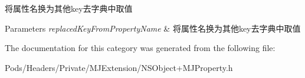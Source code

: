 将属性名换为其他key去字典中取值


\begin{DoxyParams}{Parameters}
{\em replaced\+Key\+From\+Property\+Name} & 将属性名换为其他key去字典中取值 \\
\hline
\end{DoxyParams}


The documentation for this category was generated from the following file\+:\begin{DoxyCompactItemize}
\item 
Pods/\+Headers/\+Private/\+M\+J\+Extension/N\+S\+Object+\+M\+J\+Property.\+h\end{DoxyCompactItemize}
